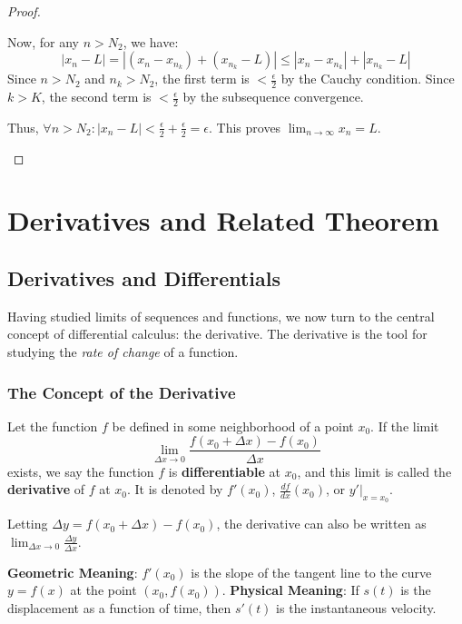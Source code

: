 \begin{proof}
\begin{enumerate}
    Now, for any $n > N_2$, we have:
    \[
    |x_n - L| = |(x_n - x_{n_k}) + (x_{n_k} - L)| \leq |x_n - x_{n_k}| + |x_{n_k} - L|
    \]
    Since $n > N_2$ and $n_k > N_2$, the first term is $< \frac{\epsilon}{2}$ by the Cauchy condition.
    Since $k > K$, the second term is $< \frac{\epsilon}{2}$ by the subsequence convergence.
    
    Thus, $\forall n > N_2: |x_n - L| < \frac{\epsilon}{2} + \frac{\epsilon}{2} = \epsilon$.
    This proves $\lim_{n \to \infty} x_n = L$.
\end{enumerate}
\end{proof}

\section{Derivatives and Related Theorem}

\subsection{Derivatives and Differentials}

Having studied limits of sequences and functions, we now turn to the central concept of differential calculus: the derivative. The derivative is the tool for studying the \textit{rate of change} of a function.

\subsubsection{The Concept of the Derivative}

\begin{definition}[Derivative]
Let the function $f$ be defined in some neighborhood of a point $x_0$. If the limit
\[
\lim_{\Delta x \to 0} \frac{f(x_0 + \Delta x) - f(x_0)}{\Delta x}
\]
exists, we say the function $f$ is \textbf{differentiable} at $x_0$, and this limit is called the \textbf{derivative} of $f$ at $x_0$.
It is denoted by $f'(x_0)$, $\frac{df}{dx}(x_0)$, or $y'|_{x=x_0}$.

Letting $\Delta y = f(x_0 + \Delta x) - f(x_0)$, the derivative can also be written as $\lim_{\Delta x \to 0} \frac{\Delta y}{\Delta x}$.
\end{definition}



\textbf{Geometric Meaning}: $f'(x_0)$ is the slope of the tangent line to the curve $y=f(x)$ at the point $(x_0, f(x_0))$.
\textbf{Physical Meaning}: If $s(t)$ is the displacement as a function of time, then $s'(t)$ is the instantaneous velocity.

